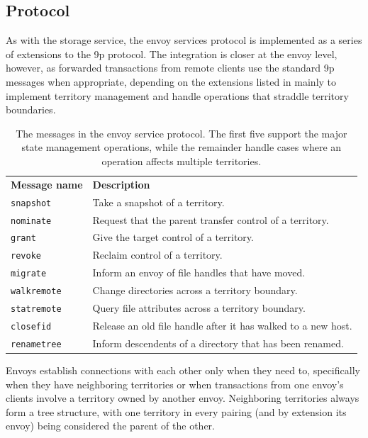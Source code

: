 \subsection{Protocol}

As with the storage service, the envoy services protocol is implemented as a series of extensions to the 9p protocol. The integration is closer at the envoy level, however, as forwarded transactions from remote clients use the standard 9p messages when appropriate, depending on the extensions listed in  mainly to implement territory management and handle operations that straddle territory boundaries.

\begin{table}[tp]
\begin{center}
\begin{tabular}{lp{8cm}}
\textbf{Message name} & \textbf{Description} \\
\texttt{snapshot} & Take a snapshot of a territory. \\
\texttt{nominate} & Request that the parent transfer control of a territory. \\
\texttt{grant} & Give the target control of a territory. \\
\texttt{revoke} & Reclaim control of a territory. \\
\texttt{migrate} & Inform an envoy of file handles that have moved. \\
\texttt{walkremote} & Change directories across a territory boundary. \\
\texttt{statremote} & Query file attributes across a territory boundary. \\
\texttt{closefid} & Release an old file handle after it has walked to a new host. \\
\texttt{renametree} & Inform descendents of a directory that has been renamed.
\end{tabular}
\end{center}
\caption[Additional messages in the envoy service protocol]{The messages in the envoy service protocol. The first five support the major state management operations, while the remainder handle cases where an operation affects multiple territories.}
\label{tab:envoy-messages}
\end{table}

Envoys establish connections with each other only when they need to, specifically when they have neighboring territories or when transactions from one envoy's clients involve a territory owned by another envoy. Neighboring territories always form a tree structure, with one territory in every pairing (and by extension its envoy) being considered the parent of the other.

